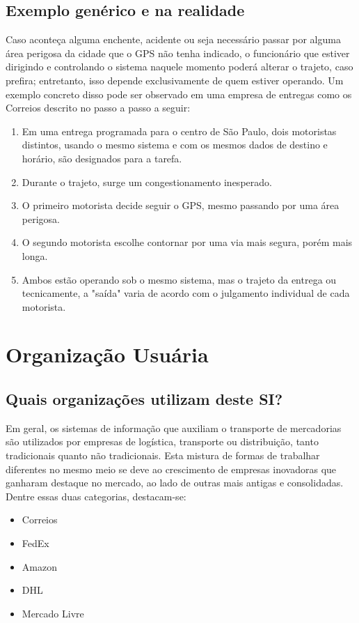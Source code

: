\documentclass[conference]{IEEEtran}
\begin{document}
\subsection{Exemplo genérico e na realidade}
Caso aconteça alguma enchente, acidente ou seja necessário passar por alguma área perigosa da cidade que o GPS não tenha indicado, o funcionário que estiver dirigindo e controlando o sistema naquele momento poderá alterar o trajeto, caso prefira; entretanto, isso depende exclusivamente de quem estiver operando. Um exemplo concreto disso pode ser observado em uma empresa de entregas como os Correios descrito no passo a passo a seguir:

\begin{enumerate}
    \item Em uma entrega programada para o centro de São Paulo, dois motoristas distintos, usando o mesmo sistema e com os mesmos dados de destino e horário, são designados para a tarefa.
    
    \item Durante o trajeto, surge um congestionamento inesperado.
    
    \item O primeiro motorista decide seguir o GPS, mesmo passando por uma área perigosa.
    
    \item O segundo motorista escolhe contornar por uma via mais segura, porém mais longa.
    
    \item Ambos estão operando sob o mesmo sistema, mas o trajeto da entrega ou tecnicamente, a "saída" varia de acordo com o julgamento individual de cada motorista.
\end{enumerate}

\section{Organização Usuária}
\subsection{Quais organizações utilizam deste SI?}

Em geral, os sistemas de informação que auxiliam o transporte de mercadorias são utilizados por empresas de logística, transporte ou distribuição, tanto tradicionais quanto não tradicionais. Esta mistura de formas de trabalhar diferentes no mesmo meio se deve ao crescimento de empresas inovadoras que ganharam destaque no mercado, ao lado de outras mais antigas e consolidadas. Dentre essas duas categorias, destacam-se:
\begin{itemize}
    \item Correios
    \item FedEx
    \item Amazon
    \item DHL
    \item Mercado Livre
\end{itemize}
\end{document}
